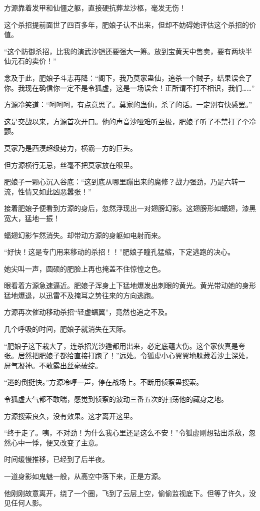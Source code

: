 \begin{this_body}
方源靠着发甲和仙僵之躯，直接硬抗葬龙沙柩，毫发无伤！

这个杀招提前面世了四百多年，肥娘子认不出来，但却不妨碍她评估这个杀招的价值。

“这个防御杀招，比我的演武沙铠还要强大一筹。放到宝黄天中售卖，要有两块半仙元石的卖价！”

念及于此，肥娘子斗志再降：“阁下，我乃莫家蛊仙，追杀一个贼子，结果误会了你。我现在确信你一定不是令狐虚，这是一场误会！正所谓不打不相识，我们……”

方源冷笑道：“呵呵呵，有点意思了。莫家的蛊仙，杀了的话。一定别有快感罢。”

这是交战以来，方源首次开口。他的声音沙哑难听至极，肥娘子听了不禁打了个冷颤。

莫家乃是西漠超级势力，横霸一方的巨头。

但方源横行无忌，丝毫不把莫家放在眼里。

肥娘子一颗心沉入谷底：“这到底从哪里蹦出来的魔修？战力强劲，乃是六转一流，性情又如此凶恶嚣张！”

接着肥娘子便看到方源的身后，忽然浮现出一对翅膀幻影。这翅膀形如蝠翅，漆黑宽大，猛地一振！

蝠翅幻影乍然消失。却带动方源的身躯如电射而来。

“好快！这是专门用来移动的杀招！！”肥娘子瞳孔猛缩，下定逃跑的决心。

她尖叫一声，圆硕的肥脸上再也掩盖不住惊惶之色。

眼看着方源急速逼近。肥娘子浑身上下猛地爆发出刺眼的黄光。黄光带动她的身形猛地爆退，以迅雷不及掩耳之势往来的方向逃跑。

方源再次催动移动杀招“轻虚蝠翼”，竟然也追之不及。

几个呼吸的时间，肥娘子就消失在天际。

“肥娘子这下栽大了，连杀招光沙遁都用出来，必定底蕴大伤。这个家伙真是夸张。居然把肥娘子都给直接打跑了！”远处。令狐虚小心翼翼地躲藏着沙土深处，屏气凝神。不敢露出丝毫破绽。

“逃的倒挺快。”方源冷哼一声，停在战场上。不断用侦察蛊搜索。

令狐虚大气都不敢喘，感觉到侦察的波动三番五次的扫荡他的藏身之地。

方源搜索良久，没有效果。这才离开这里。

“终于走了。咦，不对劲！为什么我心里还是这么不安！”令狐虚刚想钻出杀敌，忽然心中一悸，便又改变了主意。

时间缓慢推移，已经到了后半夜。

一道身影如鬼魅一般，从高空中落下来，正是方源。

他刚刚故意离开，绕了一个圈，飞到了云层上空，偷偷监视底下。但等了许久，没见任何人影。


\end{this_body}
